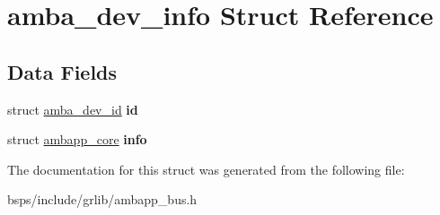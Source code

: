 \hypertarget{structamba__dev__info}{}\section{amba\+\_\+dev\+\_\+info Struct Reference}
\label{structamba__dev__info}
\subsection*{Data Fields}
\begin{DoxyCompactItemize}
\item 
\mbox{\label{structamba__dev__info_a8a698e1b6424c8cfbd89bc24accc828f}} 
struct \mbox{\hyperlink{structamba__dev__id}{amba\+\_\+dev\+\_\+id}} {\bfseries id}
\item 
\mbox{\label{structamba__dev__info_aa20c35fd61982dc90436c8c56f848d03}} 
struct \mbox{\hyperlink{structambapp__core}{ambapp\+\_\+core}} {\bfseries info}
\end{DoxyCompactItemize}


The documentation for this struct was generated from the following file\+:\begin{DoxyCompactItemize}
\item 
bsps/include/grlib/ambapp\+\_\+bus.\+h\end{DoxyCompactItemize}
